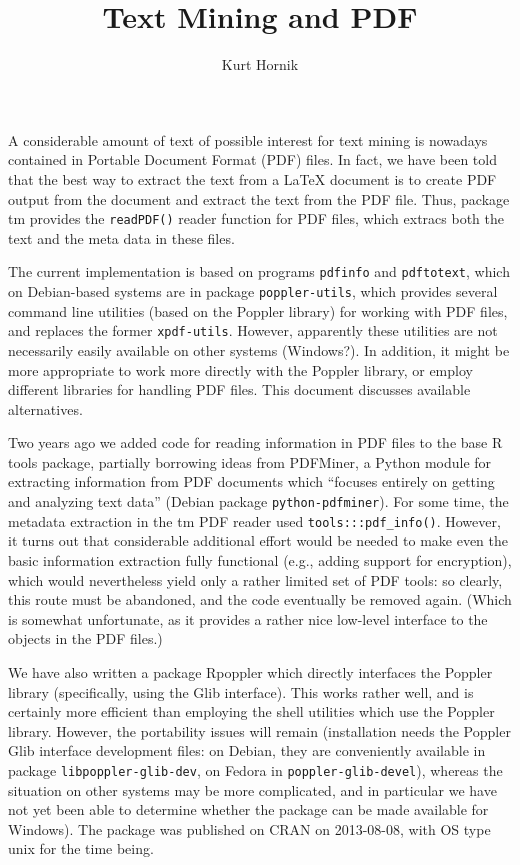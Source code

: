 \documentclass[a4paper]{article}
\title{Text Mining and PDF}
\author{Kurt Hornik}
\newcommand{\strong}[1]{{\normalfont\fontseries{b}\selectfont #1}}
\let\pkg=\strong
\begin{document}
\maketitle{}

A considerable amount of text of possible interest for text mining is
nowadays contained in Portable Document Format (PDF) files.  In fact, we
have been told that the best way to extract the text from a \LaTeX{}
document is to create PDF output from the document and extract the text
from the PDF file.  Thus, package \pkg{tm} provides the \verb|readPDF()|
reader function for PDF files, which extracs both the text and the meta
data in these files.

The current implementation is based on programs \verb|pdfinfo| and
\verb|pdftotext|, which on Debian-based systems are in package
\verb|poppler-utils|, which provides several command line utilities
(based on the Poppler library) for working with PDF files, and replaces
the former \verb|xpdf-utils|.  However, apparently these utilities are
not necessarily easily available on other systems (Windows?).  In
addition, it might be more appropriate to work more directly with the
Poppler library, or employ different libraries for handling PDF files.
This document discusses available alternatives.

Two years ago we added code for reading information in PDF files to the
base R \pkg{tools} package, partially borrowing ideas from PDFMiner, a
Python module for extracting information from PDF documents which
``focuses entirely on getting and analyzing text data'' (Debian package
\verb|python-pdfminer|).  For some time, the metadata extraction in the
\pkg{tm} PDF reader used \verb|tools:::pdf_info()|.  However, it turns
out that considerable additional effort would be needed to make even the
basic information extraction fully functional (e.g., adding support for
encryption), which would nevertheless yield only a rather limited set of
PDF tools: so clearly, this route must be abandoned, and the code
eventually be removed again.  (Which is somewhat unfortunate, as it
provides a rather nice low-level interface to the objects in the PDF
files.)

We have also written a package \pkg{Rpoppler} which directly interfaces
the Poppler library (specifically, using the Glib interface).  This
works rather well, and is certainly more efficient than employing the
shell utilities which use the Poppler library.  However, the portability
issues will remain (installation needs the Poppler Glib interface
development files: on Debian, they are conveniently available in package
\verb|libpoppler-glib-dev|, on Fedora in \verb|poppler-glib-devel|),
whereas the situation on other systems may be more complicated, and in
particular we have not yet been able to determine whether the package
can be made available for Windows).  The package was published on CRAN
on 2013-08-08, with OS type unix for the time being.
\end{document}
